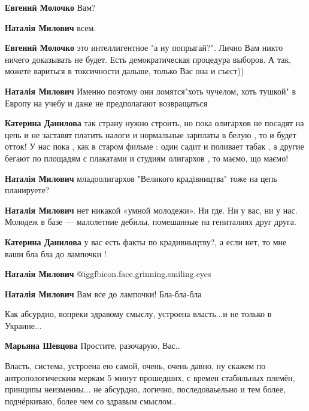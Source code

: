 \begin{itemize}
\begin{itemize}
\textbf{Евгений Молочко} Вам?

\textbf{Наталія Милович} всем.

\textbf{Евгений Молочко} это интеллигентное "а ну попрыгай?". Лично Вам никто ничего доказывать не будет. Есть демократическая процедура выборов. А так, можете вариться в токсичности дальше, только Вас она и съест))

\textbf{Наталія Милович} Именно поэтому они ломятся"хоть чучелом, хоть тушкой" в Европу на учебу и даже не предполагают возвращаться

\textbf{Катерина Данилова} так страну нужно строить, но пока олигархов не посадят на цепь и не заставят платить налоги и нормальные зарплаты в белую , то и будет отток!
У нас пока , как в старом фильме : один садит и поливает табак , а другие бегают по площадям с плакатами и студиям олигархов , то маємо, що маємо!

\textbf{Наталія Милович} младоолигархов "Великого крадiвництва" тоже на цепь планируете?

\textbf{Наталія Милович} нет никакой «умной молодежи». Ни где. Ни у вас, ни у нас. Молодеж в базе — малолетние дебилы, помешанные на гениталиях друг друга.

\textbf{Катерина Данилова} у вас есть факты по крадивныцтву?, а если нет, то мне ваши бла бла до лампочки !

\textbf{Наталія Милович}  @igg{fbicon.face.grinning.smiling.eyes} 

\textbf{Наталія Милович} Вам все до лампочки! Бла-бла-бла

\end{itemize} %


Как абсурдно, вопреки здравому смыслу, устроена власть...и не только в
Украине...

\begin{itemize} %
\textbf{Марьяна Шевцова}
Простите, разочарую, Вас..

Власть, система, устроена ею самой, очень, очень давно, ну скажем по
антропологическим меркам 5 минут прошедших, с времен стабильных племён,
принципы неизменны... не абсурдно, логично, последоваьельно и тем более,
подчёркиваю, более чем со здравым смыслом..


\end{itemize}
\end{itemize}
